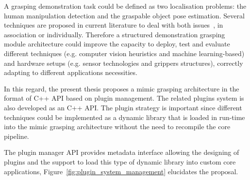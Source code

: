 A grasping demonstration task could be defined as two localisation problems: the human manipulation detection and the graspable object pose estimation. Several techniques are proposed in current literature to deal with both issues~\cite{ferreira2016stereo,COSTA2016113,hu2022grasps}, in association or individually. Therefore a structured demonstration grasping module architecture could improve the capacity to deploy, test and evaluate different techniques (e.g. computer vision heuristics and machine learning-based) and hardware setups (e.g. sensor technologies and grippers structures), correctly adapting to different applications necessities.

In this regard, the present thesis proposes a mimic grasping architecture in the format of C++ API based on plugin management. The related plugins system is also developed as an C++ API. The plugin strategy is important since different techniques could be implemented as a dynamic library that is loaded in run-time into the mimic grasping architecture without the need to recompile the core pipeline. 

The plugin manager API provides metadata interface allowing the designing of plugins and the support to load this type of dynamic library into custom core applications, Figure~\ref{fig:plugin_system_management} elucidates the proposal.



